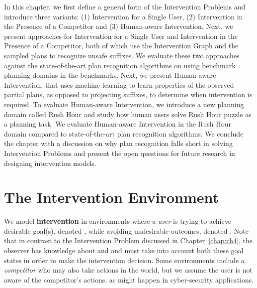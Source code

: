 In this chapter, we first define a general form of the Intervention Problems and introduce three variants: (1) Intervention for a Single User, (2) Intervention in the Presence of a Competitor and (3) Human-aware Intervention. Next, we present approaches for Intervention for a Single User and Intervention in the Presence of a Competitor, both of which use the Intervention Graph and the sampled plans to recognize unsafe suffixes. We evaluate these two approaches against the state-of-the-art plan recognition algorithms on using benchmark planning domains in the benchmarks. Next, we present Human-aware Intervention, that uses machine learning to learn properties of the observed partial plans, as opposed to projecting suffixes, to determine when intervention is required. To evaluate Human-aware Intervention, we introduce a new planning domain called Rush Hour and study how human users solve Rush Hour puzzle as a planning task. We evaluate Human-aware Intervention in the Rush Hour domain compared to state-of-the-art plan recognition algorithms. We conclude the chapter with a discussion on why plan recognition falls short in solving Intervention Problems and present the open questions for future research in designing intervention models.


\section{The Intervention Environment}
\label{sec:distinguishing}
We model {\bf intervention} in environments where a \textit{user} is trying to achieve desirable goal(s), denoted \desired, while avoiding undesirable outcomes, denoted \undesired.
Note that in contrast to the Intervention Problem discussed in Chapter~\ref{chap:ch4}, the observer has knowledge about \desired and \undesired and must take into account both these goal states in order to make the intervention decision.
Some environments include a \textit{competitor} who may also take actions in the world, but we assume the user is not aware of the competitor's actions, as might happen in cyber-security applications.

